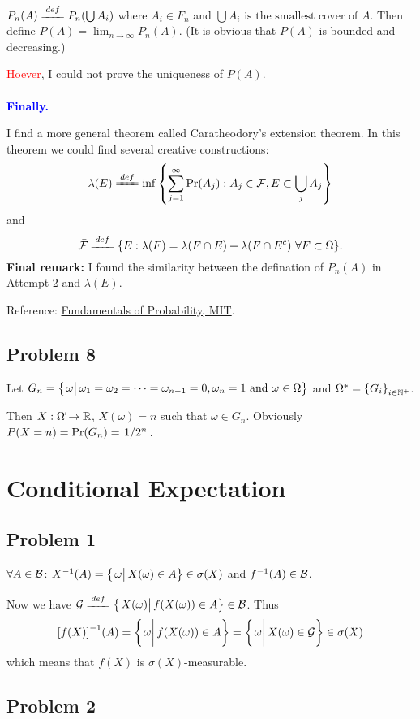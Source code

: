 \documentclass{article}
\begin{document}
$P_n(A)\deq P_n(\bigcup A_i)$ where $A_i\in F_n$ and $\bigcup A_i\mbox{ is the smallest cover of }A$. Then define $P(A)=\lim_{n\to\infty}P_n(A)$. (It is obvious that $P(A)$ is bounded and decreasing.)

\textcolor{red}{Hoever}, I could not prove the uniqueness of $P(A)$.
\\
\\
\textcolor{blue}{\textbf{Finally.}}

I find a more general theorem called Caratheodory's extension theorem. In this theorem we could find several creative constructions:
\[
	\lambda(E)\deq\inf\set{\sum_{j=1}^\infty\Pr(A_j):A_j\in\+F,E\subset\bigcup_j A_j}
\] and 
\[
	\bar{\+F}\deq\set{E:\lambda(F)=\lambda(F\cap E)+\lambda(F\cap E^c)\ \forall F\subset\Omega}
.\] 
\textbf{Final remark:} I found the similarity between the defination of $P_n(A)$ in Attempt 2 and  $\lambda(E)$.

Reference: \href{https://ocw.mit.edu/courses/electrical-engineering-and-computer-science/6-436j-fundamentals-of-probability-fall-2018/lecture-notes/MIT6_436JF18_lec02.pdf}{Fundamentals of Probability, MIT}.

\subsection*{\centering Problem 8}

Let $G_n=\set{\eval{\omega}\omega_1=\omega_2=\cdots=\omega_{n-1}=0,\omega_n=1 \mbox{ and } \omega\in\Omega}$ and $\Omega^*=\qty{G_i}_{i\in\mathbb{N}^+}$.

Then $X:\Omega^\mapsto \mathbb{R}$, $X(\omega)=n$ such that $\omega\in G_n$.
Obviously $P(X=n)=\Pr(G_n)=\flatfrac{1}{2^n}$.


\section{Conditional Expectation}
\subsection*{\centering Problem 1}
$\forall A\in\mathcal{B}$: $X^{-1}(A)=\set{\eval{\omega}X(\omega)\in A}\in\sigma(X)$ and $f^{-1}(A)\in\mathcal{B}$.

Now we have $\+G\deq\set{\eval{X(\omega)}f(X(\omega))\in A}\in\+B$.
Thus 
\[
	\qty[f(X)]^{-1}(A)=\set{\eval{\omega}f(X(\omega))\in A}=\set{\eval{\omega}X(\omega)\in\+G}\in\sigma(X)
\]
which means that $f(X)$ is $\sigma(X)$-measurable.

\subsection*{\centering Problem 2}
\end{document}
